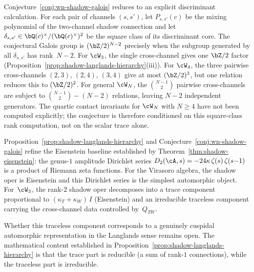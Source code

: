 \begin{remark}
\label{rem:wn-galois-criterion}
Conjecture~\ref{conj:wn-shadow-galois} reduces to an explicit
discriminant calculation. For each pair of channels $(s,s')$, let
$P_{s,s'}(c)$ be the mixing polynomial of the two-channel shadow
connection and let
$\delta_{s,s'}\in\bQ(c)^\times/(\bQ(c)^\times)^2$
be the square class of its discriminant core. The conjectural
Galois group is $(\bZ/2)^{N-2}$ precisely when the subgroup generated
by all $\delta_{s,s'}$ has rank~$N-2$.
For $\cW_3$, the single cross-channel gives one $\bZ/2$ factor
(Proposition~\ref{prop:shadow-langlands-hierarchy}(iii)).
For $\cW_4$, the three pairwise cross-channels $(2,3)$,
$(2,4)$, $(3,4)$ give at most $(\bZ/2)^3$, but one relation
reduces this to $(\bZ/2)^2$.
For general $\cW_N$, the $\binom{N-1}{2}$ pairwise
cross-channels are subject to $\binom{N-1}{2} - (N{-}2)$
relations, leaving $N{-}2$ independent generators.
The quartic contact invariants for $\cW_N$ with $N \ge 4$
have not been computed explicitly; the conjecture is
therefore conditioned on this square-class rank computation, not on
the scalar trace alone.
\end{remark}

\begin{remark}
\label{rem:eisenstein-deformation}
Proposition~\ref{prop:shadow-langlands-hierarchy} and
Conjecture~\ref{conj:wn-shadow-galois} refine the Eisenstein
baseline established by Theorem~\ref{thm:shadow-eisenstein}:
the genus-$1$ amplitude Dirichlet series
$D_2(\cA,s) = -24\kappa\,\zeta(s)\,\zeta(s{-}1)$
is a product of Riemann zeta functions. For the Virasoro
algebra, the shadow oper is Eisenstein and this Dirichlet
series is the simplest automorphic object. For~$\cW_3$, the rank-$2$ shadow oper decomposes into
a trace component proportional to
$(\kappa_T + \kappa_W)\,I$ (Eisenstein) and an irreducible
traceless component carrying the cross-channel data
controlled by~$Q_{TW}$.

Whether this traceless component corresponds to a genuinely
cuspidal automorphic representation in the Langlands sense
remains open. The mathematical content established in
Proposition~\ref{prop:shadow-langlands-hierarchy} is that the
trace part is reducible (a sum of rank-$1$ connections), while
the traceless part is irreducible.
\end{remark}

